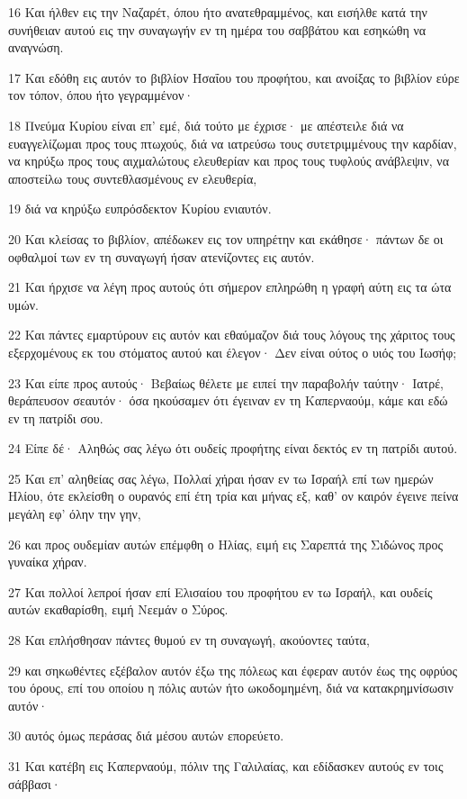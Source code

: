 \par 16 Και ήλθεν εις την Ναζαρέτ, όπου ήτο ανατεθραμμένος, και εισήλθε κατά την συνήθειαν αυτού εις την συναγωγήν εν τη ημέρα του σαββάτου και εσηκώθη να αναγνώση.
\par 17 Και εδόθη εις αυτόν το βιβλίον Ησαΐου του προφήτου, και ανοίξας το βιβλίον εύρε τον τόπον, όπου ήτο γεγραμμένον·
\par 18 Πνεύμα Κυρίου είναι επ' εμέ, διά τούτο με έχρισε· με απέστειλε διά να ευαγγελίζωμαι προς τους πτωχούς, διά να ιατρεύσω τους συτετριμμένους την καρδίαν, να κηρύξω προς τους αιχμαλώτους ελευθερίαν και προς τους τυφλούς ανάβλεψιν, να αποστείλω τους συντεθλασμένους εν ελευθερία,
\par 19 διά να κηρύξω ευπρόσδεκτον Κυρίου ενιαυτόν.
\par 20 Και κλείσας το βιβλίον, απέδωκεν εις τον υπηρέτην και εκάθησε· πάντων δε οι οφθαλμοί των εν τη συναγωγή ήσαν ατενίζοντες εις αυτόν.
\par 21 Και ήρχισε να λέγη προς αυτούς ότι σήμερον επληρώθη η γραφή αύτη εις τα ώτα υμών.
\par 22 Και πάντες εμαρτύρουν εις αυτόν και εθαύμαζον διά τους λόγους της χάριτος τους εξερχομένους εκ του στόματος αυτού και έλεγον· Δεν είναι ούτος ο υιός του Ιωσήφ;
\par 23 Και είπε προς αυτούς· Βεβαίως θέλετε με ειπεί την παραβολήν ταύτην· Ιατρέ, θεράπευσον σεαυτόν· όσα ηκούσαμεν ότι έγειναν εν τη Καπερναούμ, κάμε και εδώ εν τη πατρίδι σου.
\par 24 Είπε δέ· Αληθώς σας λέγω ότι ουδείς προφήτης είναι δεκτός εν τη πατρίδι αυτού.
\par 25 Και επ' αληθείας σας λέγω, Πολλαί χήραι ήσαν εν τω Ισραήλ επί των ημερών Ηλίου, ότε εκλείσθη ο ουρανός επί έτη τρία και μήνας εξ, καθ' ον καιρόν έγεινε πείνα μεγάλη εφ' όλην την γην,
\par 26 και προς ουδεμίαν αυτών επέμφθη ο Ηλίας, ειμή εις Σαρεπτά της Σιδώνος προς γυναίκα χήραν.
\par 27 Και πολλοί λεπροί ήσαν επί Ελισαίου του προφήτου εν τω Ισραήλ, και ουδείς αυτών εκαθαρίσθη, ειμή Νεεμάν ο Σύρος.
\par 28 Και επλήσθησαν πάντες θυμού εν τη συναγωγή, ακούοντες ταύτα,
\par 29 και σηκωθέντες εξέβαλον αυτόν έξω της πόλεως και έφεραν αυτόν έως της οφρύος του όρους, επί του οποίου η πόλις αυτών ήτο ωκοδομημένη, διά να κατακρημνίσωσιν αυτόν·
\par 30 αυτός όμως περάσας διά μέσου αυτών επορεύετο.
\par 31 Και κατέβη εις Καπερναούμ, πόλιν της Γαλιλαίας, και εδίδασκεν αυτούς εν τοις σάββασι·
